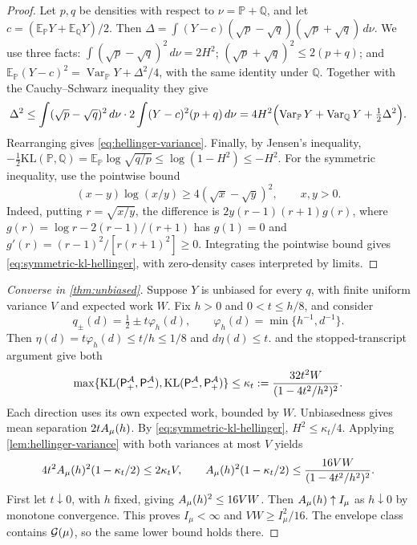 \begin{proof}
Let $p,q$ be densities with respect to $\nu=\mathbb{P}+\mathbb{Q}$, and let
$c=(\mathbb{E}_{\mathbb{P}}Y+\mathbb{E}_{\mathbb{Q}}Y)/2$. Then
$\Delta=\int(Y-c)(\sqrt p-\sqrt q)(\sqrt p+\sqrt q)\,d\nu$. We use three facts:
$\int(\sqrt p-\sqrt q)^2\,d\nu=2H^2$; $(\sqrt p+\sqrt q)^2\le2(p+q)$; and
$\mathbb{E}_{\mathbb{P}}(Y-c)^2=\operatorname{Var}_{\mathbb{P}}Y+\Delta^2/4$, with the same identity under $\mathbb{Q}$.
Together with the Cauchy--Schwarz inequality they give
\[
\Delta^2\le\int(\sqrt p-\sqrt q)^2\,d\nu\cdot2\int(Y-c)^2(p+q)\,d\nu
=4H^2\Bigl(\operatorname{Var}_{\mathbb{P}}Y+\operatorname{Var}_{\mathbb{Q}}Y+\tfrac12\Delta^2\Bigr).
\]
Rearranging gives \eqref{eq:hellinger-variance}. Finally, by Jensen's inequality,
$-\tfrac12\mathrm{KL}(\mathbb{P},\mathbb{Q})=\mathbb{E}_{\mathbb{P}}\log\sqrt{q/p}\le\log(1-H^2)\le-H^2$.
For the symmetric inequality, use the pointwise bound
\[
(x-y)\log(x/y)\ge4(\sqrt{x}-\sqrt{y})^2,\qquad x,y>0.
\]
Indeed, putting $r=\sqrt{x/y}$, the difference is
$2y(r-1)(r+1)g(r)$, where
$g(r)=\log r-2(r-1)/(r+1)$ has $g(1)=0$ and
$g'(r)=(r-1)^2/[r(r+1)^2]\ge0$. Integrating the pointwise bound gives
\eqref{eq:symmetric-kl-hellinger}, with zero-density cases interpreted by limits.
\end{proof}


\begin{proof}[Converse in \cref{thm:unbiased}]
Suppose $Y$ is unbiased for every $q$, with finite uniform variance $V$ and
expected work $W$. Fix $h>0$ and $0<t\le h/8$, and consider
\[
 q_\pm(d)=\tfrac12\pm t\varphi_h(d),\qquad
 \varphi_h(d)=\min\{h^{-1},d^{-1}\}.
\]
Then $\eta(d)=t\varphi_h(d)\le t/h\le1/8$ and $d\eta(d)\le t$.
 and the stopped-transcript argument give both
\begin{equation}\label{eq:converse-kl}
 \max\{\operatorname{KL}(\mathsf P_+^{\mathcal A},\mathsf P_-^{\mathcal A}),
        \operatorname{KL}(\mathsf P_-^{\mathcal A},\mathsf P_+^{\mathcal A})\}
 \le\kappa_t:=\frac{32t^2W}{(1-4t^2/h^2)^2}.
\end{equation}
Each direction uses its own expected work, bounded by $W$.
Unbiasedness gives mean separation $2tA_\mu(h)$.
By \eqref{eq:symmetric-kl-hellinger}, $H^2\le\kappa_t/4$.
Applying \cref{lem:hellinger-variance} with both variances at most $V$ yields
\[
 4t^2A_\mu(h)^2(1-\kappa_t/2)\le2\kappa_t V,
 \qquad
 A_\mu(h)^2(1-\kappa_t/2)
 \le\frac{16VW}{(1-4t^2/h^2)^2}.
\]
First let $t\downarrow0$, with $h$ fixed, giving $A_\mu(h)^2\le16VW$.
Then $A_\mu(h)\uparrow I_\mu$ as $h\downarrow0$ by monotone convergence.
This proves $I_\mu<\infty$ and $VW\ge I_\mu^2/16$.
The envelope class contains $\mathcal G(\mu)$, so the same lower bound holds there.
\end{proof}

